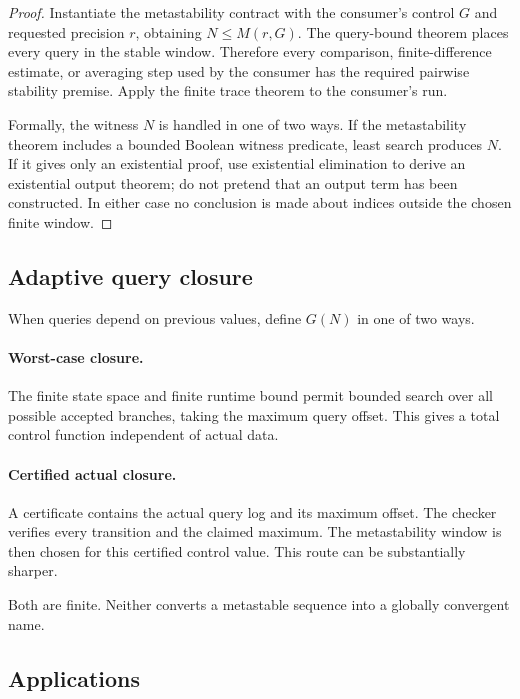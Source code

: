 \begin{proof}
Instantiate the metastability contract with the consumer's control \(G\) and
requested precision \(r\), obtaining \(N\le M(r,G)\).  The query-bound theorem
places every query in the stable window.  Therefore every comparison,
finite-difference estimate, or averaging step used by the consumer has the
required pairwise stability premise.  Apply the finite trace theorem to the
consumer's run.

Formally, the witness \(N\) is handled in one of two ways.  If the
metastability theorem includes a bounded Boolean witness predicate, least
search produces \(N\).  If it gives only an existential proof, use existential
elimination to derive an existential output theorem; do not pretend that an
output term has been constructed.  In either case no conclusion is made about
indices outside the chosen finite window.
\end{proof}

\subsection{Adaptive query closure}

When queries depend on previous values, define \(G(N)\) in one of two ways.

\paragraph{Worst-case closure.}
The finite state space and finite runtime bound permit bounded search over all
possible accepted branches, taking the maximum query offset.  This gives a
total control function independent of actual data.

\paragraph{Certified actual closure.}
A certificate contains the actual query log and its maximum offset.  The
checker verifies every transition and the claimed maximum.  The metastability
window is then chosen for this certified control value.  This route can be
substantially sharper.

Both are finite.  Neither converts a metastable sequence into a globally
convergent name.

\subsection{Applications}


